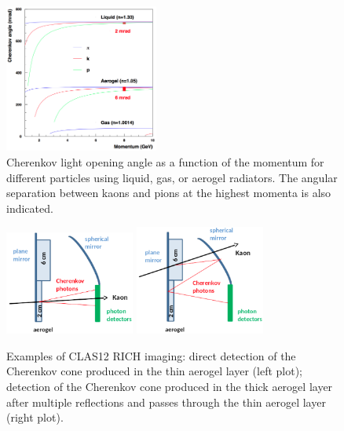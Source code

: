 \documentclass[5p,times,twocolumn]{elsarticle}
\begin{document}
\begin{figure}
\begin{center}
\includegraphics[width=0.45\textwidth]{radiators.png}
\caption{Cherenkov light opening angle as a function of the momentum for different particles using liquid, gas, or
  aerogel radiators. The angular separation between kaons and pions at the highest momenta is also indicated.}
\label{Fig:Radiators}
\end{center}
\end{figure}

\begin{figure}
\begin{center}
\includegraphics[width=0.38\textwidth]{Layout_direct.png}
\includegraphics[width=0.38\textwidth]{Layout_reflect.png}
\caption{Examples of CLAS12 RICH imaging: direct detection of the Cherenkov cone produced in the thin aerogel layer
  (left plot); detection of the Cherenkov cone produced in the thick aerogel layer after multiple reflections and passes
  through the thin aerogel layer (right plot).}
\label{Fig:RICHsketch}
\end{center}
\end{figure}
\end{document}
